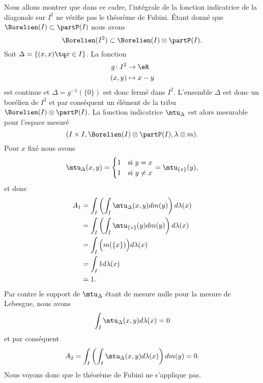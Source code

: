 \begin{example}
    Nous allons montrer que dans ce cadre, l'intégrale de la fonction indicatrice de la diagonale sur \( I^2\) ne vérifie pas le théorème de Fubini. Étant donné que \( \Borelien(I)\subset\partP(I)\) nous avons
    \begin{equation}
        \Borelien(I^2)\subset\Borelien(I)\otimes\partP(I).
    \end{equation}
    Soit \( \Delta=\{ (x,x)\tq x\in I \}\). La fonction
    \begin{equation}
        \begin{aligned}
            g\colon I^2&\to \eR \\
            (x,y)&\mapsto x-y 
        \end{aligned}
    \end{equation}
    est continue et \( \Delta=g^{-1}(\{ 0 \})\) est donc fermé dans \( I^2\). L'ensemble \( \Delta\) est donc un borélien de \( I^2\) et par conséquent un élément de la tribu \( \Borelien(I)\otimes\partP(I)\). La fonction indicatrice \( \mtu_{\Delta}\) est alors mesurable pour l'espace mesuré
    \begin{equation}
        (I\times I,\Borelien(I)\otimes\partP(I),\lambda\otimes m).
    \end{equation}
    Pour \( x\) fixé nous avons
    \begin{equation}
        \mtu_{\Delta}(x,y)=\begin{cases}
            1    &   \text{si } y= x\\
            1    &    \text{si } y\neq x
        \end{cases}=\mtu_{\{ x \}}(y),
    \end{equation}
    et donc
    \begin{subequations}
        \begin{align}
            A_1&=\int_I\left( \int_I\mtu_{\Delta}(x,y)dm(y) \right)d\lambda(x)\\
            &=\int_I\left( \int_I\mtu_{\{ x \}}(y)dm(y) \right)d\lambda(x)\\
            &=\int_I\Big( m(\{ x \}) \Big)d\lambda(x)\\
            &=\int_I 1d\lambda(x)\\
            &=1.
        \end{align}
    \end{subequations}
    Par contre le support de \( \mtu_{\Delta}\) étant de mesure nulle pour la mesure de Lebesgue, nous avons
    \begin{equation}
        \int_I\mtu_{\Delta}(x,y)d\lambda(x)=0
    \end{equation}
    et par conséquent
    \begin{equation}
        A_2=\int_I\left( \int_I\mtu_{\Delta}(x,y)d\lambda(x) \right)dm(y)=0.
    \end{equation}
    Nous voyons donc que le théorème de Fubini ne s'applique pas.
\end{example}


